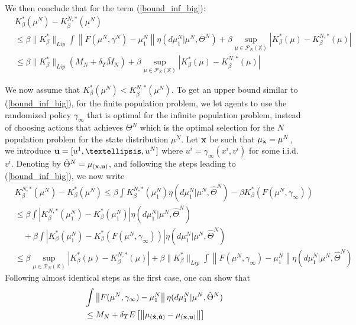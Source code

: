 \documentclass[twoside,11pt]{article}
\def\P{{\mathcal P}}
\begin{document}
We then conclude that for the term (\ref{bound_inf_big}):
\begin{align}\label{bound_inf_big1}
& K_\beta^{*}(\mu^N) - K_\beta^{N,*}(\mu^N) \nonumber\\
& \leq \beta \|K_\beta^*\|_{Lip} \int \left\| F(\mu^N,\gamma^N) - \mu_1^N\right\| \eta(d\mu_1^N|\mu^N,\Theta^N) + \beta \sup_{\mu\in \P_N(\mathds{X})} \left| K_\beta^*(\mu)-  K_\beta^{N,*}(\mu)\right|\nonumber\\
&\leq \beta \|K_\beta^*\|_{Lip} \left( M_N + \delta_T \bar{M}_N\right) +  \beta \sup_{\mu\in \P_N(\mathds{X})} \left| K_\beta^*(\mu)-  K_\beta^{N,*}(\mu)\right|
\end{align}

We now assume that $K_\beta^*(\mu^N) < K_\beta^{N,*}(\mu^N)$. To get an upper bound similar to (\ref{bound_inf_big}), for the finite population problem, we let agents to use the randomized policy $\gamma_\infty$ that is optimal for the infinite population problem, instead of choosing actions that achieves $\Theta^N$ which is the optimal selection for the $N$ population problem for the state distribution $\mu^N$.  Let ${\bf x}$ be such that $\mu_{\bf x}=\mu^N$, we introduce ${{\bf u }}= [{u}^1,\dots,{u}^N]$ where ${u}^i = \gamma_\infty(x^i,v^i)$ for some i.i.d. $v^i$.  Denoting by $\hat{\Theta}^N = \mu_{\bf (x,{u})}$, and  following the steps leading to (\ref{bound_inf_big}), we now write
\begin{align}\label{bound_fin_big}
& K_\beta^{N,*}(\mu^N) - K_\beta^{*}(\mu^N) \leq  \beta \int K_\beta^{N,*}(\mu_1^N)\eta(d\mu_1^N|\mu^N, \hat{\Theta}^N) - \beta K_\beta^*(F(\mu^N,\gamma_\infty))\nonumber\\
& \leq  \beta \int \left| K_\beta^{N,*}\left(\mu_1^N\right) - K_\beta^*(\mu_1^N)\right| \eta(d\mu_1^N|\mu^N,\hat{\Theta}^N)\nonumber\\
&\quad + \beta \int \left|  K_\beta^*(\mu_1^N) - K_\beta^{*}\left( F(\mu^N,\gamma_\infty)  \right)\right| \eta(d\mu_1^N|\mu^N,\hat{\Theta}^N)\nonumber\\
& \leq  \beta \sup_{\mu\in \P_N(\mathds{X})} \left| K_\beta^*(\mu)-  K_\beta^{N,*}(\mu)\right|+ \beta \|K_\beta^*\|_{Lip} \int \left\| F(\mu^N,\gamma_\infty) - \mu_1^N\right\| \eta(d\mu_1^N|\mu^N,\hat{\Theta}^N)
\end{align}
Following almost identical steps as the first case, one can show that
\begin{align*}
& \int \left\| F(\mu^N,\gamma_\infty) - \mu_1^N\right\| \eta(d\mu_1^N|\mu^N,\hat{\Theta}^N)\\
& \leq M_N + \delta_T  E\left[\left\|\mu_{\bf (\hat{x},\hat{u})} - \mu_{(\bf x,u)}\right\| \right] 
\end{align*} 
\end{document}
